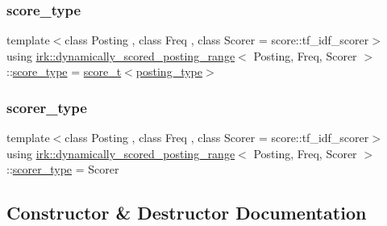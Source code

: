 \subsubsection{\texorpdfstring{score\+\_\+type}{score\_type}}
{\footnotesize\ttfamily template$<$class Posting , class Freq , class Scorer  = score\+::tf\+\_\+idf\+\_\+scorer$>$ \\
using \mbox{\hyperlink{classirk_1_1dynamically__scored__posting__range}{irk\+::dynamically\+\_\+scored\+\_\+posting\+\_\+range}}$<$ Posting, Freq, Scorer $>$\+::\mbox{\hyperlink{classirk_1_1dynamically__scored__posting__range_aa0c12118410f44552410fbcfd80c6f1b}{score\+\_\+type}} =  \mbox{\hyperlink{namespaceirk_a87bce44d1e3fdff0b1b3bb78f2a5f924}{score\+\_\+t}}$<$\mbox{\hyperlink{classirk_1_1dynamically__scored__posting__range_aac074648c23da33107bd6d03dae98ca5}{posting\+\_\+type}}$>$}

\mbox{\label{classirk_1_1dynamically__scored__posting__range_aa82b83ad2a96aeda0fff2cb233d877f9}} 
\subsubsection{\texorpdfstring{scorer\+\_\+type}{scorer\_type}}
{\footnotesize\ttfamily template$<$class Posting , class Freq , class Scorer  = score\+::tf\+\_\+idf\+\_\+scorer$>$ \\
using \mbox{\hyperlink{classirk_1_1dynamically__scored__posting__range}{irk\+::dynamically\+\_\+scored\+\_\+posting\+\_\+range}}$<$ Posting, Freq, Scorer $>$\+::\mbox{\hyperlink{classirk_1_1dynamically__scored__posting__range_aa82b83ad2a96aeda0fff2cb233d877f9}{scorer\+\_\+type}} =  Scorer}



\subsection{Constructor \& Destructor Documentation}
\mbox{\label{classirk_1_1dynamically__scored__posting__range_a0bf84be64d0211e820667a067445c50b}} 
